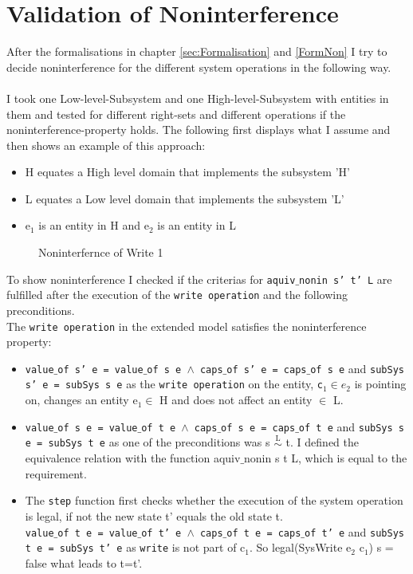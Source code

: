 \section{Validation of Noninterference}\label{ValNon}
After the formalisations in chapter \ref{sec:Formalisation} and \ref{FormNon} I try to decide noninterference for the different system operations in the following way.\\ \\
I took one Low-level-Subsystem and one High-level-Subsystem with entities in them and tested for different right-sets and different operations if the noninterference-property holds. The following first displays what I assume and then shows an example of this approach: \\ 
\begin{itemize}
\item H equates a High level domain that implements the subsystem 'H'
\item L equates a Low level domain that implements the subsystem 'L'
\item e$_1$ is an entity in H and e$_2$ is an entity in L
\end{itemize}
\begin{figure}[H]
\caption{Noninterfernce of Write 1}
\end{figure}
To show noninterference I checked if the criterias for \texttt{aquiv$\_$nonin s' t' L} are fulfilled after the execution of the \texttt{write operation} and the following preconditions. \\ 
The \texttt{write operation} in the extended model satisfies the noninterference property: 
\begin{itemize}
\item \texttt{value$\_$of s' e = value$\_$of s e $\wedge$ caps$\_$of s' e = caps$\_$of s e} and \texttt{subSys s' e = subSys s e} as the \texttt{write operation} on the entity, \texttt{c$_1 \in e_2$} is pointing on, changes an entity e$_1 \in$ H and does not affect an entity $\in$ L.
\item \texttt{value$\_$of s e = value$\_$of t e $\wedge$ caps$\_$of s e = caps$\_$of t e} and \texttt{subSys s e = subSys t e} as one of the preconditions was s $\overset{\text{L}}{\sim}$ t. I defined the equivalence relation with the function aquiv$\_$nonin s t L, which is equal to the requirement. 
\item The \texttt{step} function first checks whether the execution of the system operation is legal, if not the new state t' equals the old state t. \\
\texttt{value$\_$of t e = value$\_$of t' e $\wedge$ caps$\_$of t e = caps$\_$of t' e} and \texttt{subSys t e = subSys t' e} as \texttt{write} is not part of c$_1$. So legal(SysWrite e$_2$ c$_1$) s = false what leads to t=t'. \\
\end{itemize} 
